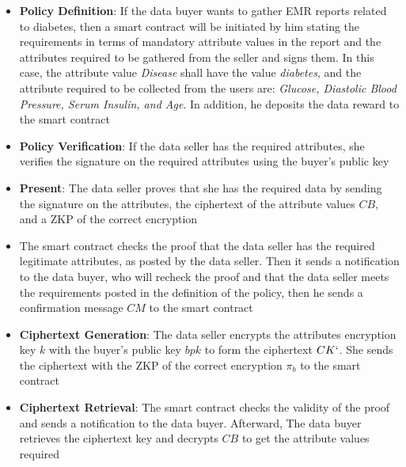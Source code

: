 \begin{itemize}
    \item \textbf{Policy Definition}: If the data buyer wants to gather EMR reports related to diabetes, then a smart contract will be initiated by him stating the requirements in terms of mandatory attribute values in the report and the attributes required to be gathered from the seller and signs them. In this case, the attribute value \textit{Disease} shall have the value \textit{diabetes}, and the attribute required to be collected from the users are: \textit{Glucose, Diastolic Blood Pressure, Serum Insulin, and Age}. In addition, he deposits the data reward to the smart contract
    \item \textbf{Policy Verification}: If the data seller has the required attributes, she verifies the signature on the required attributes using the buyer's public key
    \item \textbf{Present}: The data seller proves that she has the required data by sending the signature on the attributes, the ciphertext of the attribute values $CB$, and a ZKP of the correct encryption
    \item The smart contract checks the proof that the data seller has the required legitimate attributes, as posted by the data seller. Then it sends a notification to the data buyer, who will recheck the proof and that the data seller meets the requirements posted in the definition of the policy, then he sends a confirmation message $CM$ to the smart contract
    \item \textbf{Ciphertext Generation}: The data seller encrypts the attributes encryption key $k$ with the buyer's public key $bpk$ to form the ciphertext $CK`$. She sends the ciphertext with the ZKP of the correct encryption $\pi_b$ to the smart contract
    \item \textbf{Ciphertext Retrieval}: The smart contract checks the validity of the proof and sends a notification to the data buyer. Afterward, The data buyer retrieves the ciphertext key and decrypts $CB$ to get the attribute values required
\end{itemize}

